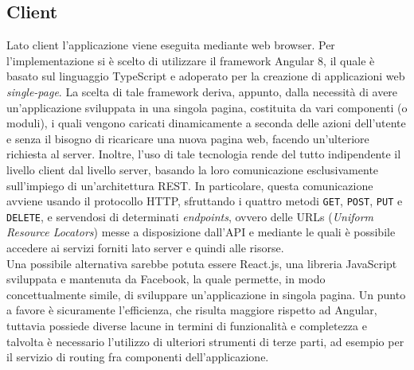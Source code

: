 \subsection{Client}
Lato client l'applicazione viene eseguita mediante web browser. Per l'implementazione si è scelto di utilizzare il framework Angular 8, il quale è basato sul linguaggio TypeScript e adoperato per la creazione di applicazioni web \textit{single-page}. La scelta di tale framework deriva, appunto, dalla necessità di avere un'applicazione sviluppata in una singola pagina, costituita da vari componenti (o moduli), i quali vengono caricati dinamicamente a seconda delle azioni dell'utente e senza il bisogno di ricaricare una nuova pagina web, facendo un'ulteriore richiesta al server. Inoltre, l'uso di tale tecnologia rende del tutto indipendente il livello client dal livello server, basando la loro comunicazione esclusivamente sull'impiego di un'architettura REST. In particolare, questa comunicazione avviene usando il protocollo HTTP, sfruttando i quattro metodi \texttt{GET}, \texttt{POST}, \texttt{PUT} e \texttt{DELETE}, e servendosi di determinati \textit{endpoints}, ovvero delle URLs (\textit{Uniform Resource Locators}) messe a disposizione dall'API e mediante le quali è possibile accedere ai servizi forniti lato server e quindi alle risorse. \\
Una possibile alternativa sarebbe potuta essere React.js, una libreria JavaScript sviluppata e mantenuta da Facebook, la quale permette, in modo concettualmente simile, di sviluppare un'applicazione in singola pagina. Un punto a favore è sicuramente l'efficienza, che risulta maggiore rispetto ad Angular, tuttavia possiede diverse lacune in termini di funzionalità e completezza e talvolta è necessario l'utilizzo di ulteriori strumenti di terze parti, ad esempio per il servizio di routing fra componenti dell'applicazione.\\

